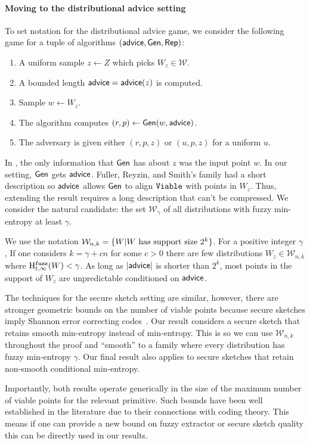 \paragraph{Moving to the distributional advice setting}
To set notation for the distributional advice game, we consider the following game for a tuple of algorithms $({\mathsf{advice}}, {\mathsf{Gen}}, {\mathsf{Rep}})$:
\begin{enumerate}
\itemsep0em
\item A uniform sample $z\leftarrow Z$ which picks $W_z\in \mathcal{W}$. 
\item A bounded length ${\mathsf{advice}} = {\mathsf{advice}}(z)$ is computed.
\item Sample $w\leftarrow W_z$.
\item The algorithm computes $(r, p)\leftarrow {\ensuremath{\mathsf{Gen}}}(w, {\mathsf{advice}})$.
\item The adversary is given either $(r, p, z)$ or $(u, p, z)$ for a uniform $u$. 
\end{enumerate}

In \cite{fuller2020fuzzy}, the only information that ${\mathsf{Gen}}$ has about $z$ was the input point $w$.  In our setting, ${\mathsf{Gen}}$ gets ${\mathsf{advice}}$.  Fuller, Reyzin, and Smith's family had a short description so ${\mathsf{advice}}$ allows ${\mathsf{Gen}}$ to align $\mathtt{Viable}$ with points in $W_z$.  Thus, extending the result requires a long description that can't be compressed.  We consider the natural candidate: the set $\mathcal{W}_\gamma$ of all distributions with fuzzy min-entropy at least $\gamma$. 

We use the notation $\mathcal{W}_{n,k} = \{W | W\text{ has support size }2^k\}$.  For a positive integer $\gamma$, If one considers $k = \gamma +cn$ for some $c>0$ there are few distributions $W_z\in\mathcal{W}_{n,k}$ where $\mathrm{H}^{\mathtt{fuzz}}_{t,\infty}(W)<\gamma$.  As long as $|{\mathsf{advice}}|$ is shorter than $2^k$, most points in the support of $W_z$ are unpredictable conditioned on ${\mathsf{advice}}$.

The techniques for the secure sketch setting are similar, however, there are stronger geometric bounds on the number of viable points because secure sketches imply Shannon error correcting codes~\cite{dodis2008fuzzy,fuller2020computational}.  Our result considers a secure sketch that retains smooth min-entropy instead of min-entropy.  This is so we can use $\mathcal{W}_{n,k}$ throughout the proof and ``smooth'' to a family where every distribution has fuzzy min-entropy $\gamma$.  Our final result also applies to secure sketches that retain non-smooth conditional min-entropy.

Importantly, both results operate generically in the size of the maximum number of viable points for the relevant primitive.  Such bounds have been well established in the literature due to their connections with coding theory.  This means if one can provide a new bound on fuzzy extractor or secure sketch quality this can be directly used in our results. 


